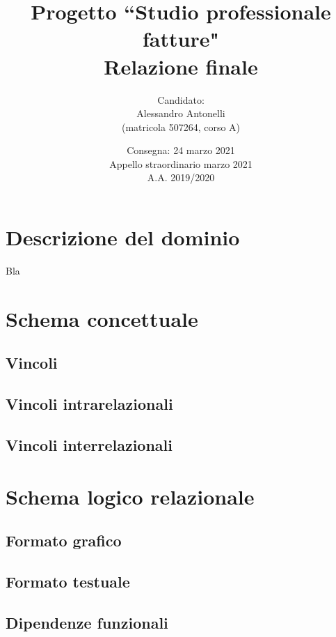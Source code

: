 \documentclass[a4paper,12pt]{article}
\title { \vspace{-4.0cm}{\small Università di Pisa\\Dipartimento di Informatica\\Corso di Laurea in Informatica\\[0.5cm]Corso di Basi di Dati (244AA), prof. Giorgio Ghelli\\[0.7cm]}Progetto ``Studio professionale fatture"\\Relazione finale }
\author { Candidato:\\Alessandro Antonelli\\(matricola 507264, corso A) }
\date { Consegna: 24 marzo 2021\\Appello straordinario marzo 2021\\A.A. 2019/2020 }
\begin{document}
 \maketitle
 
 \tableofcontents

\lstlistoflistings

 \clearpage
 

 \section{ Descrizione del dominio }

Bla

 \section{ Schema concettuale }

 \subsection{ Vincoli }

 \subsection{ Vincoli intrarelazionali }

 \subsection{ Vincoli interrelazionali }

 \section{ Schema logico relazionale }

 \subsection{ Formato grafico }

 \subsection{ Formato testuale }

 \subsection{ Dipendenze funzionali }
\end{document}
